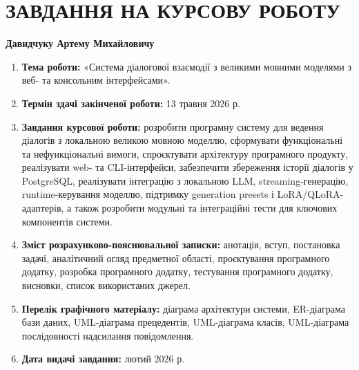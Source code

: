 \newpage
\section*{ЗАВДАННЯ НА КУРСОВУ РОБОТУ}

\begin{center}
\textbf{Давидчуку Артему Михайловичу}
\end{center}

\begin{enumerate}
  \item \textbf{Тема роботи:} «Система діалогової взаємодії з великими мовними моделями з веб- та консольним інтерфейсами».
  \item \textbf{Термін здачі закінченої роботи:} 13 травня 2026 р.
  \item \textbf{Завдання курсової роботи:} розробити програмну систему для ведення діалогів з локальною великою мовною моделлю, сформувати функціональні та нефункціональні вимоги, спроєктувати архітектуру програмного продукту, реалізувати web- та CLI-інтерфейси, забезпечити збереження історії діалогів у PostgreSQL, реалізувати інтеграцію з локальною LLM, streaming-генерацію, runtime-керування моделлю, підтримку generation presets і LoRA/QLoRA-адаптерів, а також розробити модульні та інтеграційні тести для ключових компонентів системи.
  \item \textbf{Зміст розрахунково-пояснювальної записки:} анотація, вступ, постановка задачі, аналітичний огляд предметної області, проєктування програмного додатку, розробка програмного додатку, тестування програмного додатку, висновки, список використаних джерел.
  \item \textbf{Перелік графічного матеріалу:} діаграма архітектури системи, ER-діаграма бази даних, UML-діаграма прецедентів, UML-діаграма класів, UML-діаграма послідовності надсилання повідомлення.
  \item \textbf{Дата видачі завдання:} лютий 2026 р.
\end{enumerate}

\vspace{1em}

